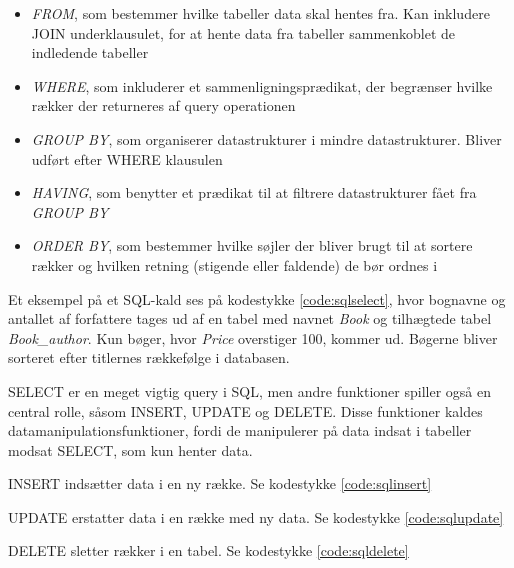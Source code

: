 \begin{itemize}
  \item \textit{FROM}, som bestemmer hvilke tabeller data skal hentes fra. Kan inkludere JOIN underklausulet, for at hente data fra tabeller sammenkoblet de indledende tabeller
  \item \textit{WHERE}, som inkluderer et sammenligningsprædikat, der begrænser hvilke rækker der returneres af query operationen
  \item \textit{GROUP BY}, som organiserer datastrukturer i mindre datastrukturer. Bliver udført efter WHERE klausulen
  \item \textit{HAVING}, som benytter et prædikat til at filtrere datastrukturer fået fra \textit{GROUP BY}
  \item \textit{ORDER BY}, som bestemmer hvilke søjler der bliver brugt til at sortere rækker og hvilken retning (stigende eller faldende) de bør ordnes i
\end{itemize}

Et eksempel på et SQL-kald ses på kodestykke \ref{code:sqlselect}, hvor bognavne og antallet af forfattere tages ud af en tabel med navnet \textit{Book} og tilhægtede tabel \textit{Book\_author}. Kun bøger, hvor \textit{Price} overstiger 100, kommer ud. Bøgerne bliver sorteret efter titlernes rækkefølge i databasen.


SELECT er en meget vigtig query i SQL, men andre funktioner spiller også en central rolle, såsom INSERT, UPDATE og DELETE. Disse funktioner kaldes datamanipulationsfunktioner, fordi de manipulerer på data indsat i tabeller modsat SELECT, som kun henter data.

\begin{itemize_small}
    \item INSERT indsætter data i en ny række. Se kodestykke \ref{code:sqlinsert}
    \item UPDATE erstatter data i en række med ny data. Se kodestykke \ref{code:sqlupdate}
    \item DELETE sletter rækker i en tabel. Se kodestykke \ref{code:sqldelete}
\end{itemize_small}


